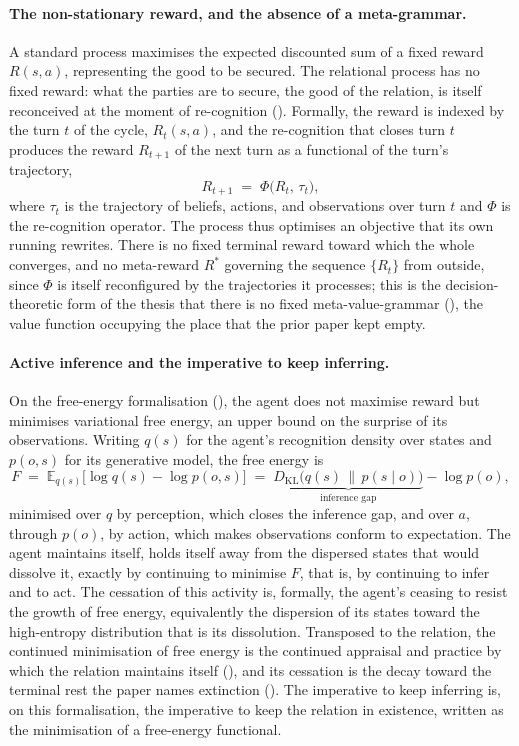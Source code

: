 \paragraph{The non-stationary reward, and the absence of a meta-grammar.}
A standard process maximises the expected discounted sum of a fixed reward $R(s,a)$, representing the good to be secured. The relational process has no fixed reward: what the parties are to secure, the good of the relation, is itself reconceived at the moment of re-cognition (). Formally, the reward is indexed by the turn $t$ of the cycle, $R_t(s,a)$, and the re-cognition that closes turn $t$ produces the reward $R_{t+1}$ of the next turn as a functional of the turn's trajectory,
\[
R_{t+1} \;=\; \Phi\big(R_t, \, \tau_t\big),
\]
where $\tau_t$ is the trajectory of beliefs, actions, and observations over turn $t$ and $\Phi$ is the re-cognition operator. The process thus optimises an objective that its own running rewrites. There is no fixed terminal reward toward which the whole converges, and no meta-reward $R^*$ governing the sequence $\{R_t\}$ from outside, since $\Phi$ is itself reconfigured by the trajectories it processes; this is the decision-theoretic form of the thesis that there is no fixed meta-value-grammar (), the value function occupying the place that the prior paper kept empty.

\paragraph{Active inference and the imperative to keep inferring.}
On the free-energy formalisation (), the agent does not maximise reward but minimises variational free energy, an upper bound on the surprise of its observations. Writing $q(s)$ for the agent's recognition density over states and $p(o,s)$ for its generative model, the free energy is
\[
F \;=\; \mathbb{E}_{q(s)}\big[\log q(s) - \log p(o, s)\big] \;=\; \underbrace{D_{\mathrm{KL}}\big(q(s)\,\|\,p(s\mid o)\big)}_{\text{inference gap}} - \log p(o),
\]
minimised over $q$ by perception, which closes the inference gap, and over $a$, through $p(o)$, by action, which makes observations conform to expectation. The agent maintains itself, holds itself away from the dispersed states that would dissolve it, exactly by continuing to minimise $F$, that is, by continuing to infer and to act. The cessation of this activity is, formally, the agent's ceasing to resist the growth of free energy, equivalently the dispersion of its states toward the high-entropy distribution that is its dissolution. Transposed to the relation, the continued minimisation of free energy is the continued appraisal and practice by which the relation maintains itself (), and its cessation is the decay toward the terminal rest the paper names extinction (). The imperative to keep inferring is, on this formalisation, the imperative to keep the relation in existence, written as the minimisation of a free-energy functional.

